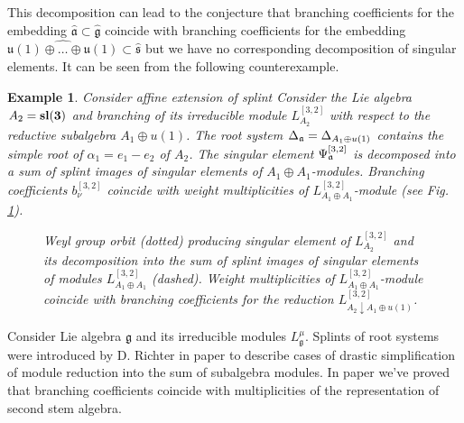 \documentclass[12pt]{article}
\newtheorem{example}{Example}[section]
\newcommand{\gf}{\mathfrak{g}}
\newcommand{\uf}{\mathfrak{u}}
\newcommand{\gfh}{\hat{\mathfrak{g}}}
\newcommand{\afh}{\hat{\mathfrak{a}}}
\newcommand{\sfh}{\hat{\mathfrak{s}}}
\begin{document}
This decomposition can lead to the conjecture that branching coefficients for the embedding $\afh\subset\gfh$ coincide with branching coefficients for the embedding $\widehat{\uf(1)\oplus\dots\oplus\uf(1)}\subset\sfh$ but we have no corresponding decomposition of singular elements. It can be seen from the following counterexample.

\begin{example}
  Consider affine extension of splint 
  Consider the Lie algebra $A_{2} =\bf{sl}(3)$ and branching of its irreducible module $L^{[3,2]}_{A_{2}}$ with respect to the reductive subalgebra $A_{1}\oplus u(1)$. The root system  $\Delta _{\frak{a}}= \Delta_{A_{1}\oplus u(1)}$ contains the simple root of $\alpha_1=e_1-e_2$ of $A_{2}$. The singular element $\Psi^{[3,2]}_{\frak{a}}$ is decomposed into a sum of splint images of singular elements of $A_{1}\oplus A_{1}$-modules. Branching coefficients $b_{\nu }^{[ 3,2 ] }$ coincide with weight multiplicities of $L^{[3,2]}_{A_{1}\oplus A_{1}}$-module (see Fig. \ref{fig:a2_splint}).

  \begin{figure}[h!bt]
  \noindent{}
  \caption{Weyl group orbit (dotted) producing singular element of $L^{[3,2]}_{A_{2}}$ and its decomposition into the sum of splint images of singular elements of modules  $L^{[3,2]}_{A_{1}\oplus A_{1}}$ (dashed). Weight multiplicities of $L^{[3,2]}_{A_{1}\oplus A_{1}}$-module coincide with branching coefficients for the reduction $L^{[3,2]}_{A_{2}\downarrow A_{1}\oplus u(1)}$.}

 \label{fig:a2_splint}
\end{figure}
\end{example}



Consider Lie algebra $\gf$ and its irreducible modules $L^{\mu}_{\gf}$. 
Splints of root systems were introduced by D. Richter in paper \cite{richter2008splints} to describe cases of drastic simplification of module reduction into the sum of subalgebra modules. In paper \cite{2011arXiv1111.6787L} we've proved that branching coefficients coincide with multiplicities of the representation of second stem algebra.
\end{document}
